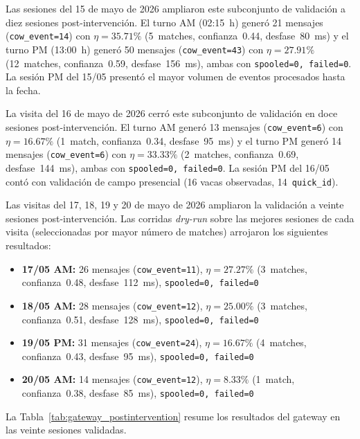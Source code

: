 Las sesiones del 15 de mayo de 2026 ampliaron este subconjunto de validación a diez sesiones post-intervención. El turno AM (02:15~h) generó 21 mensajes (\texttt{cow\_event=14}) con $\eta=35.71\%$ (5~matches, confianza~0.44, desfase~80~ms) y el turno PM (13:00~h) generó 50 mensajes (\texttt{cow\_event=43}) con $\eta=27.91\%$ (12~matches, confianza~0.59, desfase~156~ms), ambas con \texttt{spooled=0, failed=0}. La sesión PM del 15/05 presentó el mayor volumen de eventos procesados hasta la fecha.

La visita del 16 de mayo de 2026 cerró este subconjunto de validación en doce sesiones post-intervención. El turno AM generó 13 mensajes (\texttt{cow\_event=6}) con $\eta=16.67\%$ (1~match, confianza~0.34, desfase~95~ms) y el turno PM generó 14 mensajes (\texttt{cow\_event=6}) con $\eta=33.33\%$ (2~matches, confianza~0.69, desfase~144~ms), ambas con \texttt{spooled=0, failed=0}. La sesión PM del 16/05 contó con validación de campo presencial (16 vacas observadas, 14~\texttt{quick\_id}).

Las visitas del 17, 18, 19 y 20 de mayo de 2026 ampliaron la validación a veinte sesiones post-intervención. Las corridas \textit{dry-run} sobre las mejores sesiones de cada visita (seleccionadas por mayor número de matches) arrojaron los siguientes resultados:

\begin{itemize}
    \item \textbf{17/05 AM:} 26 mensajes (\texttt{cow\_event=11}), $\eta=27.27\%$ (3~matches, confianza~0.48, desfase~112~ms), \texttt{spooled=0, failed=0}
    \item \textbf{18/05 AM:} 28 mensajes (\texttt{cow\_event=12}), $\eta=25.00\%$ (3~matches, confianza~0.51, desfase~128~ms), \texttt{spooled=0, failed=0}
    \item \textbf{19/05 PM:} 31 mensajes (\texttt{cow\_event=24}), $\eta=16.67\%$ (4~matches, confianza~0.43, desfase~95~ms), \texttt{spooled=0, failed=0}
    \item \textbf{20/05 AM:} 14 mensajes (\texttt{cow\_event=12}), $\eta=8.33\%$ (1~match, confianza~0.38, desfase~85~ms), \texttt{spooled=0, failed=0}
\end{itemize}

La Tabla~\ref{tab:gateway_postintervention} resume los resultados del gateway en las veinte sesiones validadas.

